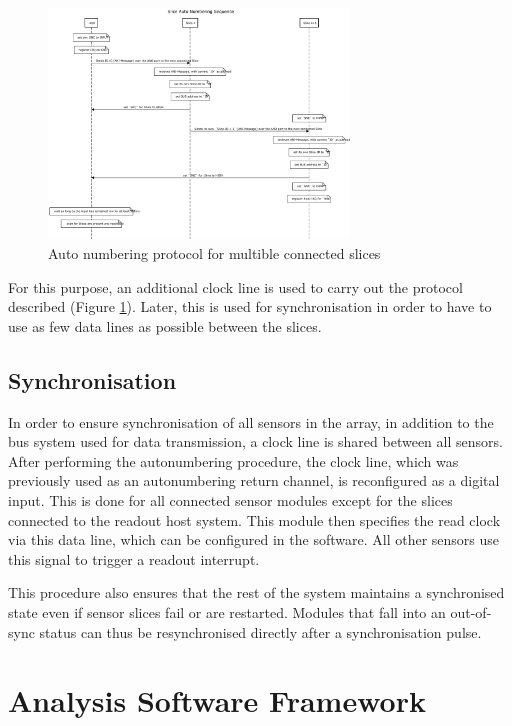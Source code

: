 \documentclass[conference]{IEEEtran}
\begin{document}
\begin{figure}[htbp]
\centerline{\includegraphics[width=8cm]{anp.png}}
\caption{Auto numbering protocol for multible connected slices}
\label{anp_fig}
\end{figure}

For this purpose, an additional clock line is used to carry out the protocol described (Figure \ref{anp_fig}). Later, this is used for synchronisation in order to have to use as few data lines as possible between the slices.

    


\subsection{Synchronisation}

In order to ensure synchronisation of all sensors in the array, in addition to the bus system used for data transmission, a clock line is shared between all sensors.
After performing the autonumbering procedure, the clock line, which was previously used as an autonumbering return channel, is reconfigured as a digital input.
This is done for all connected sensor modules except for the slices connected to the readout host system.
This module then specifies the read clock via this data line, which can be configured in the software.
All other sensors use this signal to trigger a readout interrupt.

This procedure also ensures that the rest of the system maintains a synchronised state even if sensor slices fail or are restarted.
Modules that fall into an out-of-sync status can thus be resynchronised directly after a synchronisation pulse.


\section{Analysis Software Framework}
\end{document}
